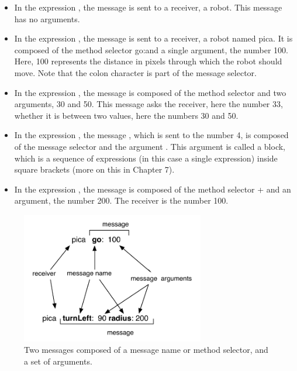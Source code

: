 \documentclass[a4paper,10pt,twoside]{book}
\begin{document}
\begin{itemize} 
\item In the expression , the message  is sent to a receiver, a 
robot. This message has no arguments. 
\item In the expression , the message  is sent to a receiver, a robot named 
pica. It is composed of the method selector go:and a single argument, the number 100. 
Here, 100 represents the distance in pixels through which the robot should move. Note 
that the colon character is part of the message selector. 
\item  In the expression , the message  is 
composed of the method selector  and two arguments, 30 and 50. This 
message asks the receiver, here the number 33, whether it is between two values, here 
the numbers 30 and 50. 
\item In the expression , the message , which is sent to the number 4, is composed of the message selector 
 and the argument \ct{[ pica go: 100 ]}. This argument is called a block, 
which is a sequence of expressions (in this case a single expression) inside square 
brackets (more on this in Chapter 7). 
\item In the expression , the message  is composed of the method selector + 
and an argument, the number 200. The receiver is the number 100. 
\end{itemize}

\begin{figure}[h]
\begin{center}\includegraphics[width=8cm]{5-message}
\caption{Two messages composed of  a message name or method selector, and a set of arguments.\label{fig:firstScriptMessage}}\end{center}
\end{figure}
\end{document}
